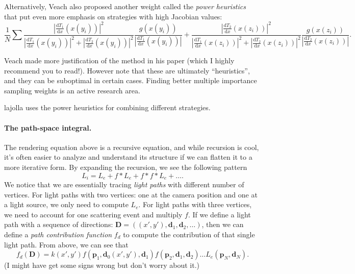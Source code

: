 \documentclass{article}
\begin{document}
Alternatively, Veach also proposed another weight called the \emph{power heuristics} that put even more emphasis on strategies with high Jacobian values:
\begin{equation}
\frac{1}{N} \sum
\frac{|\frac{\mathrm{d}T_1}{\mathrm{d}x}(x(y_i))|^2}{|\frac{\mathrm{d}T_1}{\mathrm{d}x}(x(y_i))|^2 + |\frac{\mathrm{d}T_2}{\mathrm{d}x}(x(y_i))|^2}
\frac{g(x(y_i))}{|\frac{\mathrm{d}T_1}{\mathrm{d}x}(x(y_i))|} + 
\frac{|\frac{\mathrm{d}T_2}{\mathrm{d}x}(x(z_i))|^2}{|\frac{\mathrm{d}T_1}{\mathrm{d}x}(x(z_i))|^2 + |\frac{\mathrm{d}T_2}{\mathrm{d}x}(x(z_i))|^2}
\frac{g(x(z_i))}{|\frac{\mathrm{d}T_2}{\mathrm{d}x}(x(z_i))|}.
\end{equation}

Veach made more justification of the method in his paper (which I highly recommend you to read!). However note that these are ultimately ``heuristics'', and they can be suboptimal in certain cases. Finding better multiple importance sampling weights is an active research area.

lajolla uses the power heuristics for combining different strategies.

\paragraph{The path-space integral.} The rendering equation above is a recursive equation, and while recursion is cool, it's often easier to analyze and understand its structure if we can flatten it to a more iterative form. By expanding the recursion, we see the following pattern
\begin{equation}
    L_i = L_e + f * L_e + f * f * L_e + \dots.
\end{equation}
We notice that we are essentially tracing \emph{light paths} with different number of vertices. For light paths with two vertices: one at the camera position and one at a light source, we only need to compute $L_e$. For light paths with three vertices, we need to account for one scattering event and multiply $f$. If we define a light path with a sequence of directions: $\mathbf{D} = ((x', y'), \mathbf{d}_1, \mathbf{d}_2, \dots)$, then we can define a \emph{path contribution function} $f_d$ to compute the contribution of that single light path. From above, we can see that
\begin{equation}
    f_d(\mathbf{D}) = k(x', y') f(\mathbf{p}_1, \mathbf{d}_0(x', y'), \mathbf{d}_1) f(\mathbf{p}_2, \mathbf{d}_1, \mathbf{d}_2) \dots L_e(\mathbf{p}_N, \mathbf{d}_N).
\end{equation}
(I might have get some signs wrong but don't worry about it.)
\end{document}

